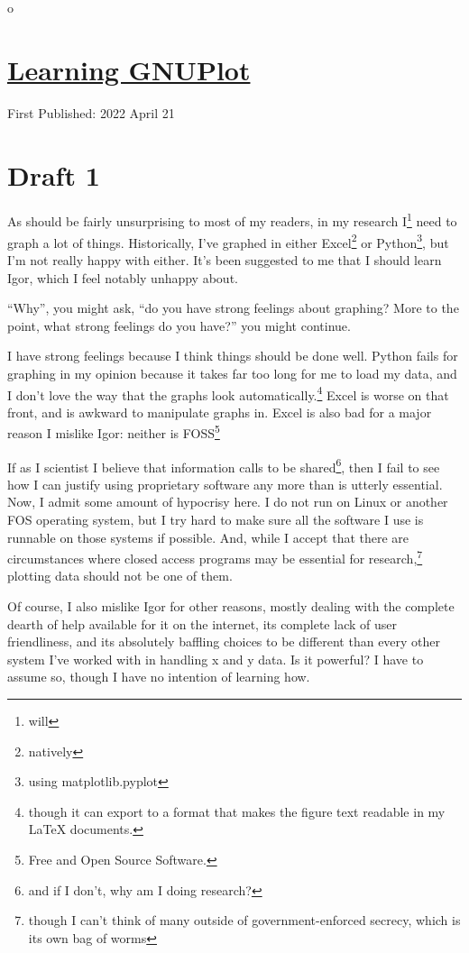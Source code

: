o\documentclass[12pt]{article}[titlepage]
\newcommand{\say}[1]{``#1''}
\newcommand{\1}{\={a}}
\newcommand{\2}{\={e}}
\newcommand{\3}{\={\i}}
\newcommand{\4}{\=o}
\newcommand{\5}{\=u}
\newcommand{\6}{\={A}}
\renewcommand{\,}{\textsuperscript{,}}
\begin{document}
\doublespacing
\section{\href{learning-gnuplot.html}{Learning GNUPlot}}
First Published: 2022 April 21


\section{Draft 1}
As should be fairly unsurprising to most of my readers, in my research I\footnote{will} need to graph a lot of things.
Historically, I've graphed in either Excel\footnote{natively} or Python\footnote{using matplotlib.pyplot}, but I'm not really happy with either.
It's been suggested to me that I should learn Igor, which I feel notably unhappy about.

\say{Why}, you might ask, \say{do you have strong feelings about graphing?
More to the point, what strong feelings do you have?}
you might continue.

I have strong feelings because I think things should be done well.
Python fails for graphing in my opinion because it takes far too long for me to load my data, and I don't love the way that the graphs look automatically.\footnote{though it can export to a format that makes the figure text readable in my LaTeX documents.}
Excel is worse on that front, and is awkward to manipulate graphs in.
Excel is also bad for a major reason I mislike Igor: neither is FOSS\footnote{Free and Open Source Software.}

If as I scientist I believe that information calls to be shared\footnote{and if I don't, why am I doing research?}, then I fail to see how I can justify using proprietary software any more than is utterly essential.
Now, I admit some amount of hypocrisy here.
I do not run on Linux or another FOS operating system, but I try hard to make sure all the software I use is runnable on those systems if possible.
And, while I accept that there are circumstances where closed access programs may be essential for research,\footnote{though I can't think of many outside of government-enforced secrecy, which is its own bag of worms} plotting data should not be one of them.

Of course, I also mislike Igor for other reasons, mostly dealing with the complete dearth of help available for it on the internet, its complete lack of user friendliness, and its absolutely baffling choices to be different than every other system I've worked with in handling x and y data.
Is it powerful?
I have to assume so, though I have no intention of learning how.
\end{document}

